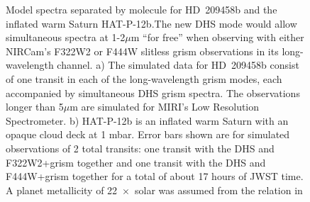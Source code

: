 \documentclass[iop]{emulateapj}
\begin{document}
\begin{figure}[!thb]
\centering
{}
	\caption{Model spectra separated by molecule for HD~209458b and the inflated warm Saturn HAT-P-12b.The new DHS mode would allow simultaneous spectra at 1-2$\mu$m ``for free'' when observing with either NIRCam's F322W2 or F444W slitless grism observations in its long-wavelength channel. a) The simulated data for HD~209458b consist of one transit in each of the long-wavelength grism modes, each accompanied by simultaneous DHS grism spectra. The observations longer than 5$\mu$m are simulated for MIRI's Low Resolution Spectrometer. b) HAT-P-12b is an inflated warm Saturn with an opaque cloud deck at 1 mbar. Error bars shown are for simulated observations of 2 total transits: one transit with the DHS and F322W2+grism together and one transit with the DHS and F444W+grism together for a total of about 17 hours of JWST time. A planet metallicity of 22~$\times$~solar was assumed from the relation in \citet{kreidberg2014wasp43}}
	\label{fig:spec}
\end{figure} 

\end{document}
